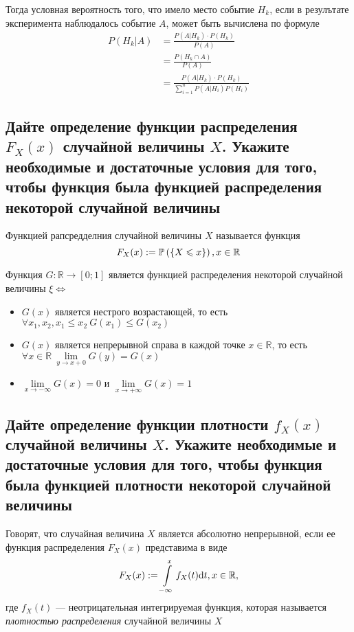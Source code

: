 \documentclass{article}
\begin{document}
Тогда условная вероятность того, что имело место событие $H_k$, если в резулътате эксперимента наблюдалось событие $A$, может быть вычислена по формуле
\begin{equation*}
    \begin{aligned}
        P(H_k|A)&=\frac{P(A|H_k)\cdot P(H_k)}{P(A)}\\
        &=\frac{P(H_k\cap A)}{P(A)}\\
        &=\frac{P(A|H_k)\cdot P(H_k)}{\sum_{i=1}^{n} P(A|H_i)P(H_i)}
    \end{aligned}
\end{equation*}


\subsection{Дайте определение функции распределения $F_X (x)$ случайной величины $X$. Укажите необходимые и достаточные условия для того, чтобы функция была функцией распределения некоторой случайной величины}
 Функцией рапсредделния случайной величины $X$ называется функция 
\begin{equation*}
    F_X(x):=\mathbb{P}\left(\{X\leqslant x\}\right),x\in\mathbb{R}
\end{equation*}

\theorem Функция $G:\mathbb{R}\to[0;1]$ является функцией распределения некоторой случайной величины $\xi\Longleftrightarrow$
\begin{itemize}
    \item $G(x)$ является нестрого возрастающей, то есть $\forall x_1,x_2, x_1\leqslant x_2\ G(x_1)\leqslant G(x_2)$
    \item $G(x)$ является непрерывной справа в каждой точке $x\in\mathbb{R}$, то есть $\forall x\in\mathbb{R}\ \lim\limits_{y\to x+0} G(y)=G(x)$
    \item $\lim\limits_{x\to-\infty} G(x)=0$ и $\lim\limits_{x\to+\infty} G(x)=1$
\end{itemize}

\subsection{Дайте определение функции плотности $f_X (x)$ случайной величины $X$. Укажите необходимые и достаточные условия для того, чтобы функция была функцией плотности некоторой случайной величины}
 Говорят, что случайная величина $X$ является абсолютно непрерывной, если ее функция распределения $F_{X}(x)$ представима в виде
\begin{equation*}
    F_X(x):=\int\limits_{-\infty}^{x}f_X(t)\text{d}t,x\in\mathbb{R},
\end{equation*}
где $f_X(t)$ — неотрицательная интегрируемая функция, которая называется \textit{плотностью распределения} случайной величины $X$
\end{document}
